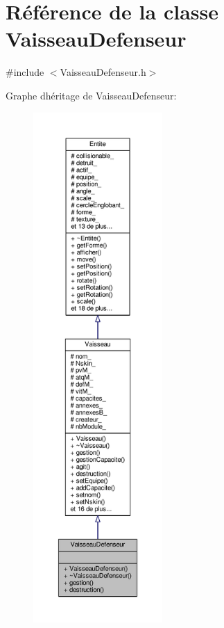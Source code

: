 \hypertarget{class_vaisseau_defenseur}{}\section{Référence de la classe Vaisseau\+Defenseur}
\label{class_vaisseau_defenseur}


{\ttfamily \#include $<$Vaisseau\+Defenseur.\+h$>$}



Graphe d\textquotesingle{}héritage de Vaisseau\+Defenseur\+:\nopagebreak
\begin{figure}[H]
\begin{center}
\leavevmode
\includegraphics[height=550pt]{class_vaisseau_defenseur__inherit__graph}
\end{center}
\end{figure}


